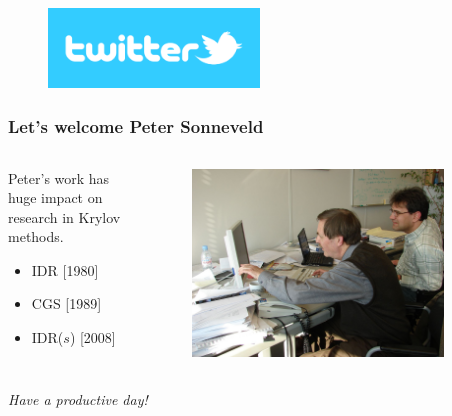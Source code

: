 \documentclass{beamer}
\begin{document}
\begin{frame}
\huge{
  \begin{figure}[t]
  \includegraphics[width=0.5\textwidth]{pics/twitter-logo.png}
  \end{figure}
}
\end{frame}

\begin{frame}
\frametitle{Let's welcome Peter Sonneveld}
 \begin{columns}
 \begin{column}{0.6\textwidth}
 Peter's work has huge impact on research in Krylov methods.
 \begin{itemize}
  \item IDR [1980]
  \item CGS [1989]
  \item IDR($s$) [2008]
 \end{itemize}
 \end{column}

 \begin{column}{0.4\textwidth}
  \begin{figure}[t]
  \includegraphics[width=0.9\textwidth]{pics/idr1.jpg}
  \end{figure}
 \end{column}
 \end{columns}
 \vspace{1cm}
 \pause
 \begin{center}
  \textit{Have a productive day!}
 \end{center}
\end{frame}
\end{document}
